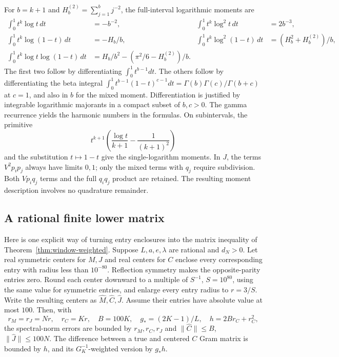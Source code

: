 \documentclass[11pt]{article}
\theoremstyle{definition}
\theoremstyle{remark}
\numberwithin{equation}{section}
\begin{document}
For $b=k+1$ and $H_b^{(2)}=\sum_{j=1}^b j^{-2}$, the
full-interval logarithmic moments are
\begin{align}
 \int_0^1t^k\log t\,dt&=-b^{-2},&
 \int_0^1t^k\log^2t\,dt&=2b^{-3},\nonumber\\
 \int_0^1t^k\log(1-t)\,dt&=-H_b/b,&
 \int_0^1t^k\log^2(1-t)\,dt&=(H_b^2+H_b^{(2)})/b,\nonumber\\
 \int_0^1t^k\log t\log(1-t)\,dt
   &=H_b/b^2-(\pi^2/6-H_b^{(2)})/b.
 \label{eq:window-log-moments}
\end{align}
The first two follow by differentiating $\int_0^1t^{b-1}dt$.
The others follow by differentiating the beta integral
$\int_0^1t^{b-1}(1-t)^{c-1}dt=
\Gamma(b)\Gamma(c)/\Gamma(b+c)$ at $c=1$, and also in $b$
for the mixed moment.  Differentiation is justified by integrable
logarithmic majorants in a compact subset of $b,c>0$.
The gamma recurrence yields the harmonic numbers in the formulas.
On subintervals, the primitive
\[
 t^{k+1}\left(\frac{\log t}{k+1}-\frac1{(k+1)^2}\right)
\]
and the substitution $t\mapsto1-t$ give the single-logarithm
moments.  In $J$, the terms $V^2p_ip_j$ always have limits
$0,1$; only the mixed terms with $q_j$ require subdivision.
Both $Vp_iq_j$ terms and the full $q_iq_j$ product are retained.
The resulting moment description involves no quadrature remainder.

\subsection{A rational finite lower matrix}

Here is one explicit way of turning entry enclosures into the
matrix inequality of Theorem~\ref{thm:window-weighted}.
Suppose $L,a,e,\lambda$ are rational and $d_N>0$.
Let real symmetric centers for $M,J$ and real centers for $C$
enclose every corresponding entry with radius less than $10^{-80}$.
Reflection symmetry makes the opposite-parity entries zero.
Round each center downward to a multiple of $S^{-1}$, $S=10^{80}$,
using the same value for symmetric entries, and enlarge every entry
radius to $r=3/S$.  Write the resulting centers as
$\widehat M,\widehat C,\widehat J$.  Assume their entries have
absolute value at most $100$.  Then, with
\[
 r_M=r_J=Nr,\quad r_C=Kr,\quad B=100K,\quad
 g_*=(2K-1)/L,\quad h=2Br_C+r_C^2,
\]
the spectral-norm errors are bounded by $r_M,r_C,r_J$ and
$\|\widehat C\|\le B$, $\|\widehat J\|\le100N$.
The difference between a true and centered $C$ Gram matrix is
bounded by $h$, and its $G_K^{-1}$-weighted version by $g_*h$.
\end{document}

